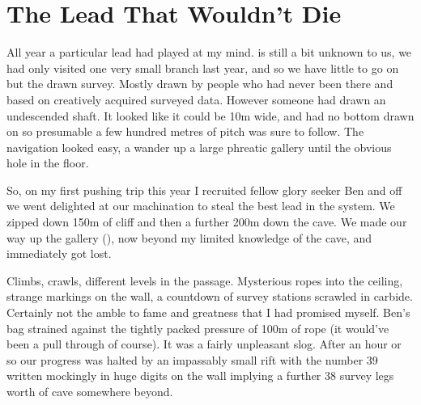 \section{The Lead That Wouldn't Die}
\label{sec:fenestrator}
\begin{marginfigure}
\end{marginfigure}

\label{sec:bigshaft}
All year a particular lead had played at my mind.  is still a bit unknown to us, we had only visited one very small branch last year, and so we have little to go on but the drawn survey. Mostly drawn by people who had never been there and based on creatively acquired surveyed data. However someone had drawn an undescended shaft. It looked like it could be 10m wide, and had no bottom drawn on so presumable a few hundred metres of pitch was sure to follow. The navigation looked easy, a wander up a large phreatic gallery until the obvious hole in the floor.

So, on my first pushing trip this year I recruited fellow glory seeker Ben and off we went delighted at our machination to steal the best lead in the system. We zipped down 150m of cliff and then a further 200m down the cave. We made our way up the gallery (), now beyond my limited knowledge of the cave, and immediately got lost.
 
Climbs, crawls, different levels in the passage. Mysterious ropes into the ceiling, strange markings on the wall, a countdown of survey stations scrawled in carbide. Certainly not the amble to fame and greatness that I had promised myself.  Ben's bag strained against the tightly packed pressure of 100m of rope (it would've been a pull through of course). It was a fairly unpleasant slog. After an hour or so our progress was halted by an impassably small rift with the number 39 written mockingly in huge digits on the wall implying a further 38 survey legs worth of cave somewhere beyond. 
 
